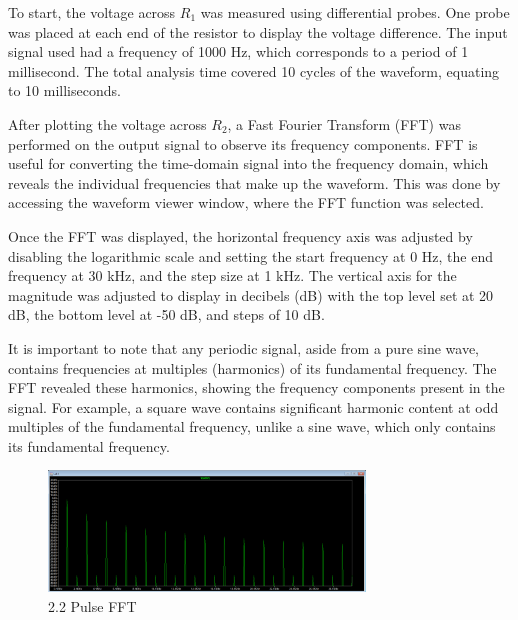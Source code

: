 \documentclass{article}
\begin{document}
To start, the voltage across $R_1$ was measured using differential probes. One
probe was placed at each end of the resistor to display the voltage difference.
The input signal used had a frequency of 1000 Hz, which corresponds to a period
of 1 millisecond. The total analysis time covered 10 cycles of the waveform,
equating to 10 milliseconds. 
\newline

After plotting the voltage across $R_2$, a Fast Fourier Transform (FFT) was performed on the
output signal to observe its frequency components. FFT is useful for converting
the time-domain signal into the frequency domain, which reveals the individual
frequencies that make up the waveform. This was done by accessing the waveform
viewer window, where the FFT function was selected. 
\newline

Once the FFT was displayed,
the horizontal frequency axis was adjusted by disabling the logarithmic scale
and setting the start frequency at 0 Hz, the end frequency at 30 kHz, and the
step size at 1 kHz. The vertical axis for the magnitude was adjusted to display
in decibels (dB) with the top level set at 20 dB, the bottom level at -50 dB,
and steps of 10 dB. 
\newline

It is important to note that any periodic signal, aside from
a pure sine wave, contains frequencies at multiples (harmonics) of its
fundamental frequency. The FFT revealed these harmonics, showing the frequency
components present in the signal. For example, a square wave contains
significant harmonic content at odd multiples of the fundamental frequency,
unlike a sine wave, which only contains its fundamental frequency. 
\newline 

\begin{figure}[H]
	\centering
	\includegraphics[width=0.75\textwidth]{Copy of Lab 4 - 2.2.PNG}
	\caption{2.2 Pulse FFT}
	\label{fig:fig3}
\end{figure}
\end{document}

